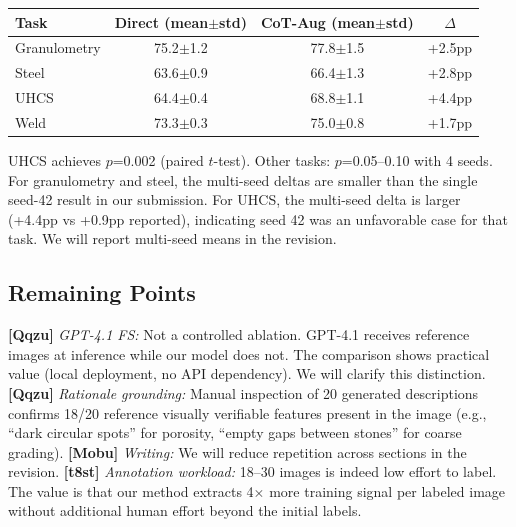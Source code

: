 \documentclass[10pt,twocolumn,letterpaper]{article}
\begin{document}
\vspace{-2pt}
\begin{table}[h]
\centering\small
\setlength{\tabcolsep}{3pt}
\begin{tabular}{lccc}
\toprule
Task & Direct (mean$\pm$std) & CoT-Aug (mean$\pm$std) & $\Delta$ \\
\midrule
Granulometry & 75.2$\pm$1.2 & 77.8$\pm$1.5 & +2.5pp \\
Steel & 63.6$\pm$0.9 & 66.4$\pm$1.3 & +2.8pp \\
UHCS & 64.4$\pm$0.4 & 68.8$\pm$1.1 & +4.4pp \\
Weld & 73.3$\pm$0.3 & 75.0$\pm$0.8 & +1.7pp \\
\bottomrule
\end{tabular}
\vspace{-6pt}
\end{table}

UHCS achieves $p$=0.002 (paired $t$-test). Other tasks: $p$=0.05--0.10 with 4 seeds. For granulometry and steel, the multi-seed deltas are smaller than the single seed-42 result in our submission. For UHCS, the multi-seed delta is larger (+4.4pp vs +0.9pp reported), indicating seed 42 was an unfavorable case for that task. We will report multi-seed means in the revision.

\subsection{Remaining Points}

\textbf{[Qqzu]} \textit{GPT-4.1 FS:} Not a controlled ablation. GPT-4.1 receives reference images at inference while our model does not. The comparison shows practical value (local deployment, no API dependency). We will clarify this distinction.
\textbf{[Qqzu]} \textit{Rationale grounding:} Manual inspection of 20 generated descriptions confirms 18/20 reference visually verifiable features present in the image (e.g., ``dark circular spots'' for porosity, ``empty gaps between stones'' for coarse grading).
\textbf{[Mobu]} \textit{Writing:} We will reduce repetition across sections in the revision.
\textbf{[t8st]} \textit{Annotation workload:} 18--30 images is indeed low effort to label. The value is that our method extracts 4$\times$ more training signal per labeled image without additional human effort beyond the initial labels.

{\small


}
\end{document}
